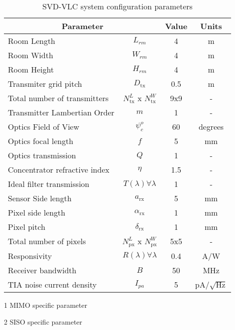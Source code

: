 \begin{table}[!t] %
\centering
\begin{threeparttable}[b]
\caption{SVD-VLC system configuration parameters}
\label{tblSystem}
\centering
	\begin{tabular}{|l|c|c|c|}
		\hline
		\multicolumn{2}{|c|}{\bf{Parameter}} & \bf{Value} & \bf{Units}\\
		\hline
		Room Length & $L_{rm}$ & 4 & m\\
		\hline
		Room Width & $W_{rm}$ & 4 & m\\
		\hline
		Room Height & $H_{rm}$ & 4 & m\\
		\hline
		Transmiter grid pitch\tnote{1} & $D_{\text{tx}}$ & 0.5 & m\\
		\hline
		Total number of transmitters\tnote{1} & $N_{\text{tx}}^{L}$ x $N_{\text{tx}}^{W}$ & 9x9 & -\\
		\hline
		Transmitter Lambertian Order & $m$ & 1 & -\\
		\hline
		Optics Field of View & $\psi_{c}^{o}$ & 60 & degrees\\
		\hline
		Optics focal length\tnote{1} & $f$ & 5 & mm\\
		\hline
	  Optics transmission\tnote{1} & $Q$ & 1 & -\\
		\hline
		Concentrator refractive index\tnote{2} & $\eta$ & 1.5 & -\\
		\hline
		Ideal filter transmission & $T(\lambda)\forall \lambda$ & 1 & -\\
		\hline
		Sensor Side length & $a_{\text{rx}}$ & 5 & mm\\
		\hline
		Pixel side length\tnote{1} & $\alpha_{\text{rx}}$ & 1 & mm\\
		\hline
		Pixel pitch\tnote{1} & $\delta_{\text{rx}}$ & 1 & mm\\
		\hline
		Total number of pixels\tnote{1} & $N_{\text{px}}^{L}$ x $N_{\text{px}}^{W}$ & 5x5 & -\\
		\hline
		Responsivity & $R(\lambda)\forall \lambda$ & 0.4 & A/W\\
		\hline
		Receiver bandwidth & $B$ & 50 & MHz\\
		\hline
		TIA noise current density & $I_{pa}$ & 5 & pA/$\sqrt{\text{Hz}}$\\
		\hline
	\end{tabular}
	\begin{tablenotes}
	\item [1] MIMO specific parameter
	\item [2] SISO specific parameter
	\end{tablenotes}
	\end{threeparttable}
\end{table}

